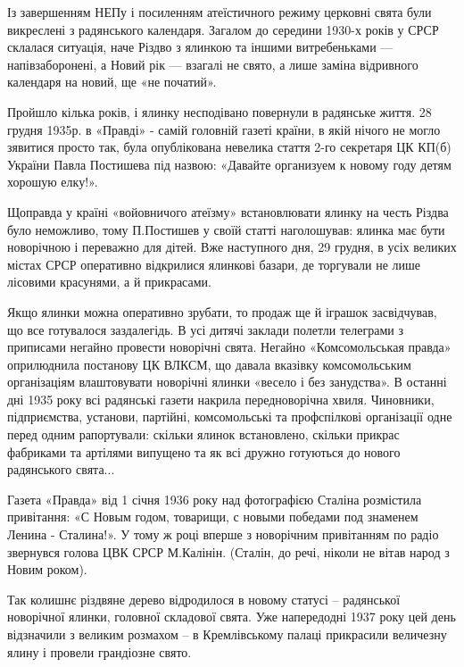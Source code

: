 
Із завершенням НЕПу і посиленням атеїстичного режиму церковні свята були
викреслені з радянського календаря. Загалом до середини 1930-х років у СРСР
склалася ситуація, наче Різдво з ялинкою та іншими витребеньками —
напівзаборонені, а Новий рік — взагалі не свято, а лише заміна відривного
календаря на новий, ще «не початий».


Пройшло кілька років, і ялинку несподівано повернули в радянське життя. 28
грудня 1935р. в «Правді» - самій головній газеті країни, в якій нічого не могло
зявитися просто так, була опублікована невелика стаття 2-го секретаря ЦК КП(б)
України Павла Постишева під назвою: «Давайте организуем к новому году детям
хорошую елку!».  

Щоправда у країні «войовничого атеїзму» встановлювати ялинку на честь Різдва
було неможливо, тому П.Постишев у своїй статті наголошував: ялинка має бути
новорічною і переважно для дітей. Вже наступного дня, 29 грудня, в усіх великих
містах СРСР оперативно відкрилися ялинкові базари, де торгували не лише
лісовими красунями, а й прикрасами.

Якщо ялинки можна оперативно зрубати, то продаж ще й іграшок засвідчував, що
все готувалося заздалегідь. В усі дитячі заклади полетли телеграми з приписами
негайно провести новорічні свята. Негайно «Комсомольськая правда»  оприлюднила
постанову ЦК ВЛКСМ, що давала вказівку комсомольським організаціям влаштовувати
новорічні ялинки «весело і без занудства». В останні дні 1935 року всі
радянські газети накрила передноворічна хвиля. Чиновники, підприємства,
установи, партійні, комсомольські та профспілкові організації одне перед одним
рапортували: скільки ялинок встановлено, скільки прикрас фабриками та артілями
випущено та як всі дружно готуються до нового радянського свята...

Газета «Правда» від 1 січня 1936 року над фотографією Сталіна розмістила
привітання: «С Новым годом, товарищи, с новыми победами под знаменем Ленина -
Сталина!». У тому ж році вперше з новорічним привітанням по радіо звернувся
голова ЦВК СРСР М.Калінін. (Сталін, до речі, ніколи не вітав народ з Новим
роком).

Так колишнє різдвяне дерево відродилося в новому статусі – радянської
новорічної ялинки, головної складової свята. Уже напередодні 1937 року цей день
відзначили з великим розмахом – в Кремлівському палаці прикрасили величезну
ялину і провели грандіозне свято.

